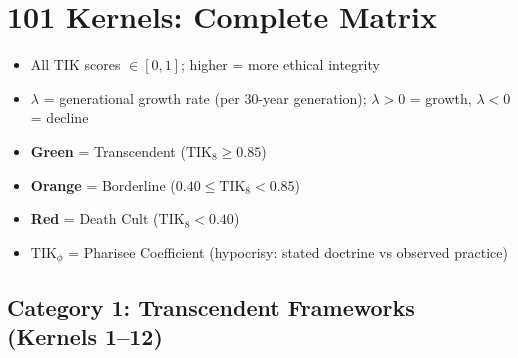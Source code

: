 \documentclass[11pt,a4paper]{article}
\theoremstyle{definition}
\theoremstyle{remark}
\newcommand{\TIKeight}{\text{TIK}_8}
\newcommand{\TIKpharisee}{\text{TIK}_{\phi}}    %
\begin{document}
\section{101 Kernels: Complete Matrix}
\label{sec:kernels}

\begin{scibox}
\begin{itemize}[noitemsep]
  \item All TIK scores $\in [0,1]$; higher = more ethical integrity
  \item $\lambda$ = generational growth rate (per 30-year generation);
    $\lambda > 0$ = growth, $\lambda < 0$ = decline
  \item \textcolor{survival}{\textbf{Green}} = Transcendent
    ($\TIKeight \geq 0.85$)
  \item \textcolor{borderline}{\textbf{Orange}} = Borderline
    ($0.40 \leq \TIKeight < 0.85$)
  \item \textcolor{collapse}{\textbf{Red}} = Death Cult
    ($\TIKeight < 0.40$)
  \item $\TIKpharisee$ = Pharisee Coefficient
    (hypocrisy: stated doctrine vs observed practice)
\end{itemize}
\end{scibox}

\vspace{0.3cm}

\subsection{Category 1: Transcendent Frameworks (Kernels 1--12)}
\label{sec:cat1}
\end{document}

